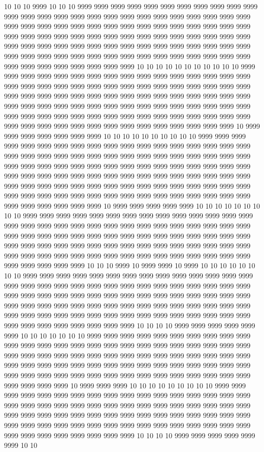 10 10 10 9999 10 10 10 9999 9999 9999 9999 9999 9999 9999 9999 9999 9999 9999 9999 9999 9999 9999 9999 9999 9999 9999 9999 9999 9999 9999 9999 9999 9999 9999 9999 9999 9999 9999 9999 9999 9999 9999 9999 9999 9999 9999 9999 9999 9999 9999 9999 9999 9999 9999 9999 9999 9999 9999 9999 9999 9999 9999 9999 9999 9999 9999 9999 9999 9999 9999 9999 9999 9999 9999 9999 9999 9999 9999 9999 9999 9999 9999 9999 9999 9999 9999 9999 9999 9999 9999 9999 9999 9999 9999 9999 9999 9999 9999 9999 9999 9999 10 10 10 10 10 10 10 10 10 10 10 9999 9999 9999 9999 9999 9999 9999 9999 9999 9999 9999 9999 9999 9999 9999 9999 9999 9999 9999 9999 9999 9999 9999 9999 9999 9999 9999 9999 9999 9999 9999 9999 9999 9999 9999 9999 9999 9999 9999 9999 9999 9999 9999 9999 9999 9999 9999 9999 9999 9999 9999 9999 9999 9999 9999 9999 9999 9999 9999 9999 9999 9999 9999 9999 9999 9999 9999 9999 9999 9999 9999 9999 9999 9999 9999 9999 9999 9999 9999 9999 9999 9999 9999 9999 9999 9999 9999 9999 9999 9999 10 9999 9999 9999 9999 9999 9999 9999 10 10 10 10 10 10 10 10 10 10 9999 9999 9999 9999 9999 9999 9999 9999 9999 9999 9999 9999 9999 9999 9999 9999 9999 9999 9999 9999 9999 9999 9999 9999 9999 9999 9999 9999 9999 9999 9999 9999 9999 9999 9999 9999 9999 9999 9999 9999 9999 9999 9999 9999 9999 9999 9999 9999 9999 9999 9999 9999 9999 9999 9999 9999 9999 9999 9999 9999 9999 9999 9999 9999 9999 9999 9999 9999 9999 9999 9999 9999 9999 9999 9999 9999 9999 9999 9999 9999 9999 9999 9999 9999 9999 9999 9999 9999 9999 9999 9999 9999 9999 9999 9999 9999 9999 9999 9999 10 9999 9999 9999 9999 9999 10 10 10 10 10 10 10 10 10 9999 9999 9999 9999 9999 9999 9999 9999 9999 9999 9999 9999 9999 9999 9999 9999 9999 9999 9999 9999 9999 9999 9999 9999 9999 9999 9999 9999 9999 9999 9999 9999 9999 9999 9999 9999 9999 9999 9999 9999 9999 9999 9999 9999 9999 9999 9999 9999 9999 9999 9999 9999 9999 9999 9999 9999 9999 9999 9999 9999 9999 9999 9999 9999 9999 9999 9999 9999 9999 9999 9999 9999 9999 9999 9999 9999 9999 9999 9999 10 10 10 9999 10 9999 9999 10 9999 10 10 10 10 10 10 10 10 9999 9999 9999 9999 9999 9999 9999 9999 9999 9999 9999 9999 9999 9999 9999 9999 9999 9999 9999 9999 9999 9999 9999 9999 9999 9999 9999 9999 9999 9999 9999 9999 9999 9999 9999 9999 9999 9999 9999 9999 9999 9999 9999 9999 9999 9999 9999 9999 9999 9999 9999 9999 9999 9999 9999 9999 9999 9999 9999 9999 9999 9999 9999 9999 9999 9999 9999 9999 9999 9999 9999 9999 9999 9999 9999 9999 9999 9999 9999 9999 9999 9999 10 10 10 10 9999 9999 9999 9999 9999 9999 10 10 10 10 10 10 10 9999 9999 9999 9999 9999 9999 9999 9999 9999 9999 9999 9999 9999 9999 9999 9999 9999 9999 9999 9999 9999 9999 9999 9999 9999 9999 9999 9999 9999 9999 9999 9999 9999 9999 9999 9999 9999 9999 9999 9999 9999 9999 9999 9999 9999 9999 9999 9999 9999 9999 9999 9999 9999 9999 9999 9999 9999 9999 9999 9999 9999 9999 9999 9999 9999 9999 9999 9999 9999 9999 9999 9999 9999 9999 10 9999 9999 9999 10 10 10 10 10 10 10 10 10 9999 9999 9999 9999 9999 9999 9999 9999 9999 9999 9999 9999 9999 9999 9999 9999 9999 9999 9999 9999 9999 9999 9999 9999 9999 9999 9999 9999 9999 9999 9999 9999 9999 9999 9999 9999 9999 9999 9999 9999 9999 9999 9999 9999 9999 9999 9999 9999 9999 9999 9999 9999 9999 9999 9999 9999 9999 9999 9999 9999 9999 9999 9999 9999 9999 9999 9999 9999 9999 9999 10 10 10 10 9999 9999 9999 9999 9999 9999 10 10 